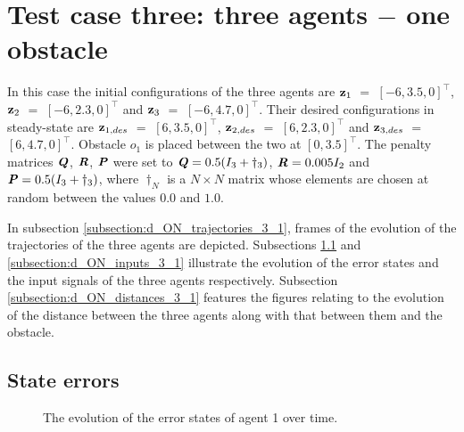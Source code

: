 \section{Test case three: three agents $-$ one obstacle}

In this case the initial configurations of the three agents are
$\bm{\mathbf{z}}_1$ $=$ $[-6, 3.5, 0]^{\top}$,
$\bm{\mathbf{z}}_2$ $=$ $[-6, 2.3, 0]^{\top}$ and
$\bm{\mathbf{z}}_3$ $=$ $[-6, 4.7, 0]^{\top}$.
Their desired configurations in steady-state are
$\bm{\mathbf{z}}_{1,des}$ $=$ $[6, 3.5, 0]^{\top}$,
$\bm{\mathbf{z}}_{2,des}$ $=$ $[6, 2.3, 0]^{\top}$ and
$\bm{\mathbf{z}}_{3,des}$ $=$ $[6, 4.7, 0]^{\top}$.
Obstacle $o_1$ is placed between the two at $[0, 3.5]^{\top}$. The penalty
matrices $\bm{\mathit{Q}}$, $\bm{\mathit{R}}$, $\bm{\mathit{P}}$ were set to
$\bm{\mathit{Q}} = 0.5 (I_3 + \dagger_3)$, $\bm{\mathit{R}} = 0.005 I_2$ and
$\bm{\mathit{P}} = 0.5 (I_3 + \dagger_3)$, where $\dagger_N$ is a $N \times N$ matrix
whose elements are chosen at random between the values $0.0$ and $1.0$.

In subsection \ref{subsection:d_ON_trajectories_3_1}, frames of the evolution of the
trajectories of the three agents are depicted. Subsections
\ref{subsection:d_ON_errors_3_1} and \ref{subsection:d_ON_inputs_3_1} illustrate
the evolution of the error states and the input signals of the three agents
respectively. Subsection \ref{subsection:d_ON_distances_3_1} features the
figures relating to the evolution of the distance between the three agents
along with that between them and the obstacle.

\subsection{State errors}
\label{subsection:d_ON_errors_3_1}

\begin{figure}[H]\centering
  \scalebox{0.7}{}
  \caption{The evolution of the error states of agent 1 over time.}
  \label{fig:d_ON_3_1_errors_agent_1}
\end{figure}

\noindent{}


